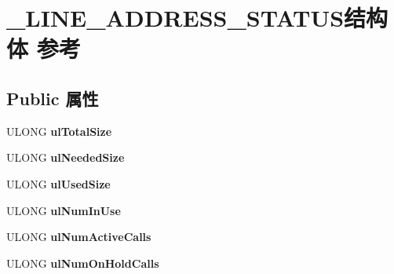 \hypertarget{struct___l_i_n_e___a_d_d_r_e_s_s___s_t_a_t_u_s}{}\section{\+\_\+\+L\+I\+N\+E\+\_\+\+A\+D\+D\+R\+E\+S\+S\+\_\+\+S\+T\+A\+T\+U\+S结构体 参考}
\label{struct___l_i_n_e___a_d_d_r_e_s_s___s_t_a_t_u_s}
\subsection*{Public 属性}
\begin{DoxyCompactItemize}
\item 
\mbox{\label{struct___l_i_n_e___a_d_d_r_e_s_s___s_t_a_t_u_s_a0c445e9898dc062a8739eccced4bbeca}} 
U\+L\+O\+NG {\bfseries ul\+Total\+Size}
\item 
\mbox{\label{struct___l_i_n_e___a_d_d_r_e_s_s___s_t_a_t_u_s_a6ca27e761ffca0f3be97262ae390a096}} 
U\+L\+O\+NG {\bfseries ul\+Needed\+Size}
\item 
\mbox{\label{struct___l_i_n_e___a_d_d_r_e_s_s___s_t_a_t_u_s_a1b8a8e25207dacfc84cd807142928c19}} 
U\+L\+O\+NG {\bfseries ul\+Used\+Size}
\item 
\mbox{\label{struct___l_i_n_e___a_d_d_r_e_s_s___s_t_a_t_u_s_a79e27d8c3bf8c75a3716c50e7d1bc196}} 
U\+L\+O\+NG {\bfseries ul\+Num\+In\+Use}
\item 
\mbox{\label{struct___l_i_n_e___a_d_d_r_e_s_s___s_t_a_t_u_s_aa30a4109bcd78c3df0078952b2717aff}} 
U\+L\+O\+NG {\bfseries ul\+Num\+Active\+Calls}
\item 
\mbox{\label{struct___l_i_n_e___a_d_d_r_e_s_s___s_t_a_t_u_s_ab3ae03b91becae6ce02161de49fec777}} 
U\+L\+O\+NG {\bfseries ul\+Num\+On\+Hold\+Calls}
\item 
\mbox{\label{struct___l_i_n_e___a_d_d_r_e_s_s___s_t_a_t_u_s_aed38a3fe0e15aa269de7679d041e0ee4}} 

\end{DoxyCompactItemize}
